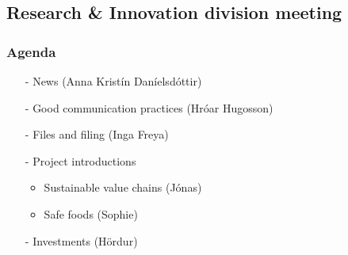 \subsection{Research \& Innovation division meeting}
\label{task:20180105_cj1}

\subsubsection{Agenda}
\begin{enumerate}
    \item[-] News (Anna Kristín Daníelsdóttir)
    \item[-] Good communication practices (Hróar Hugosson)
    \item[-] Files and filing (Inga Freya)
    \item[-] Project introductions
    \begin{itemize}
        \item Sustainable value chains (Jónas)
        \item Safe foods (Sophie)
    \end{itemize}
    \item[-] Investments (Hördur)
\end{enumerate}

